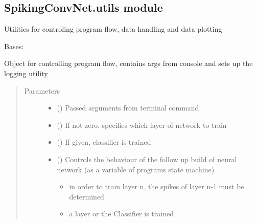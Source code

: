 \documentclass[letterpaper,10pt,english]{sphinxmanual}
\begin{document}
\subsection{SpikingConvNet.utils module}
\label{\detokenize{SpikingConvNet:spikingconvnet-utils-module}}\label{\detokenize{SpikingConvNet:module-SpikingConvNet.utils}}
Utilities for controling program flow, data handling and data plotting

\begin{fulllineitems}
\label{\detokenize{SpikingConvNet:SpikingConvNet.utils.RunControl}}
Bases: 

Object for controlling program flow, contains args from console and sets
up the logging utility
\begin{quote}\begin{description}
\item[{Parameters}] \leavevmode\begin{itemize}
\item {} 
 () \textendash{} Passed arguments from terminal command

\item {} 
 () \textendash{} If not zero, specifies which layer of network to train

\item {} 
 () \textendash{} If given, classifier is trained

\item {} 
 () \textendash{} Controls the behaviour of the follow up build of neural network
(as a variable of programs state machine)
\begin{itemize}
\item {} 
 in order to train layer n, the spikes of layer n-1 must be determined

\item {} 
 a layer or the Classifier is trained

\end{itemize}


\end{itemize}
\end{description}
\end{quote}
\end{fulllineitems}
\end{document}
